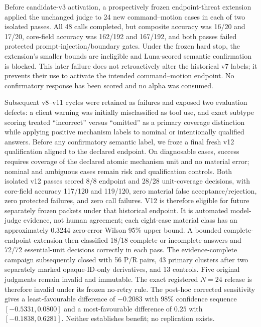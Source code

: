\documentclass[conference]{IEEEtran}
\begin{document}
Before candidate-v3 activation, a prospectively frozen endpoint-threat extension applied the
unchanged judge to 24 new command--motion cases in each of two isolated passes. All 48 calls
completed, but composite accuracy was 16/20 and 17/20, core-field accuracy was 162/192 and
167/192, and both passes failed protected prompt-injection/boundary gates. Under the frozen hard
stop, the extension's smaller bounds are ineligible and Luna-scored semantic confirmation is
blocked. This later failure does not retroactively alter the historical v7 labels; it prevents
their use to activate the intended command--motion endpoint. No confirmatory response has been
scored and no alpha was consumed.

Subsequent v8--v11 cycles were retained as failures and exposed two evaluation defects: a client
warning was initially misclassified as tool use, and exact subtype scoring treated
``incorrect'' versus ``omitted'' as a primary coverage distinction while applying positive
mechanism labels to nominal or intentionally qualified answers. Before any confirmatory semantic
label, we froze a final fresh v12 qualification aligned to the declared endpoint. On diagnosable
cases, success requires coverage of the declared atomic mechanism unit and no material error;
nominal and ambiguous cases remain risk and qualification controls. Both isolated v12 passes
scored 8/8 endpoint and 28/28 unit-coverage decisions, with core-field accuracy 117/120 and
119/120, zero material false acceptance/rejection, zero protected failures, and zero call
failures. V12 is therefore eligible for future separately frozen packets under that historical
endpoint. It is automated
model-judge evidence, not human agreement; each eight-case material class has an approximately
0.3244 zero-error Wilson 95\% upper bound. A bounded complete-endpoint extension then classified
18/18 complete or incomplete answers and 72/72 essential-unit decisions correctly in each pass.
The evidence-complete campaign subsequently closed with 56 P/R pairs, 43 primary clusters after
two separately marked opaque-ID-only derivatives, and 13 controls. Five original judgments remain
invalid and immutable. The exact registered $N=24$ release is therefore invalid under its frozen
no-retry rule. The post-hoc corrected sensitivity gives a least-favourable difference of
$-0.2083$ with 98\% confidence sequence $[-0.5331,0.0800]$ and a most-favourable difference of
$0.25$ with $[-0.1838,0.6281]$. Neither establishes benefit; no replication exists.
\end{document}
